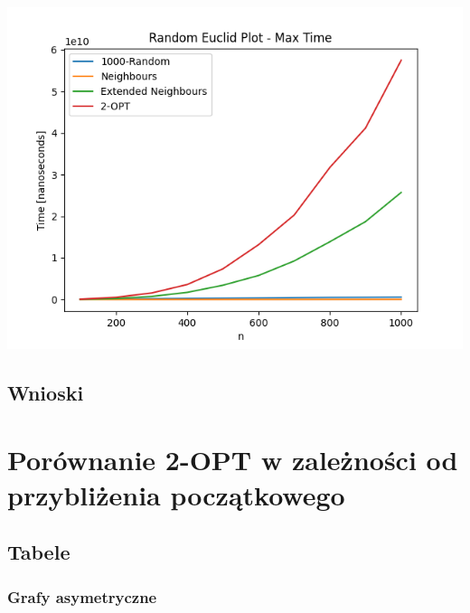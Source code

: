 \documentclass{article}
\begin{document}
\begin{center}
\includegraphics[width=\textwidth, 
                   height = 0.4\textheight, 
                   keepaspectratio]
                  {generated_euclid_max_time} 
\end{center}

\subsection{Wnioski}


\section{Porównanie 2-OPT w zależności od przybliżenia początkowego}
\subsection{Tabele}

\subsubsection{Grafy asymetryczne}
\end{document}
